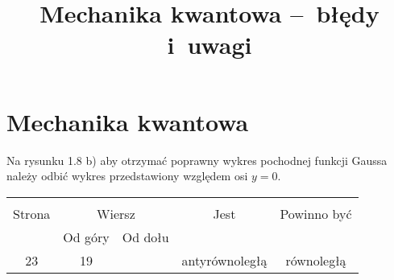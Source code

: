 \documentclass[a4paper,11pt]{article}
\title{Mechanika kwantowa --~błędy i~uwagi}
\begin{document}





\maketitle %





\section{Mechanika kwantowa}

\vspace{\spaceTwo}







\start {} Na rysunku 1.8 b) aby otrzymać poprawny wykres
pochodnej funkcji Gaussa należy odbić wykres przedstawiony względem osi
$y = 0$.

\vspace{\spaceFour}







\begin{center}

  \begin{tabular}{|c|c|c|c|c|}
    \hline
    & \multicolumn{2}{c|}{} & & \\
    Strona & \multicolumn{2}{c|}{Wiersz} & Jest
                              & Powinno być \\ \cline{2-3}
    & Od góry & Od dołu & & \\
    \hline
    23  & 19 & & antyrównoległą & równoległą \\
    \hline
  \end{tabular}

\end{center}
\end{document}
